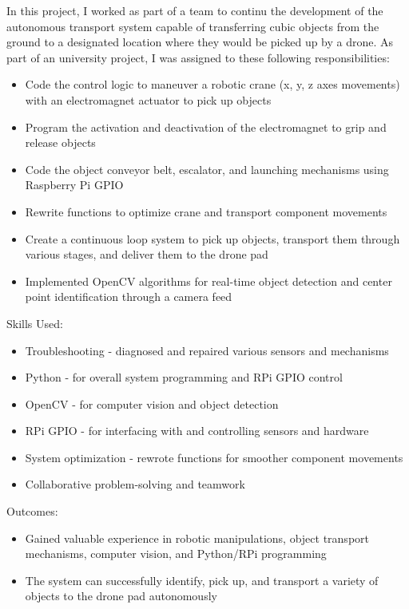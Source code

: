     {
    In this project, I worked as part of a team to continu the development of the autonomous transport system capable of transferring cubic objects from the ground to a designated location where they would be picked up by a drone.        
    As part of an university project, I was assigned to these following responsibilities:
    \begin{itemize}
        \item Code the control logic to maneuver a robotic crane (x, y, z axes movements) with an electromagnet actuator to pick up objects
        \item Program the activation and deactivation of the electromagnet to grip and release objects
        \item Code the object conveyor belt, escalator, and launching mechanisms using Raspberry Pi GPIO
        \item Rewrite functions to optimize crane and transport component movements
        \item Create a continuous loop system to pick up objects, transport them through various stages, and deliver them to the drone pad
        \item Implemented OpenCV algorithms for real-time object detection and center point identification through a camera feed
    \end{itemize}
    \vspace{2mm}
    Skills Used:
    \begin{itemize}
        \item Troubleshooting - diagnosed and repaired various sensors and mechanisms
        \item Python - for overall system programming and RPi GPIO control
        \item OpenCV - for computer vision and object detection
        \item RPi GPIO - for interfacing with and controlling sensors and hardware
        \item System optimization - rewrote functions for smoother component movements
        \item Collaborative problem-solving and teamwork
    \end{itemize}
    \vspace{1mm}
    Outcomes:
    \begin{itemize}
        \item Gained valuable experience in robotic manipulations, object transport mechanisms, computer vision, and Python/RPi programming
        \item The system can successfully identify, pick up, and transport a variety of objects to the drone pad autonomously
    \end{itemize}
    }

